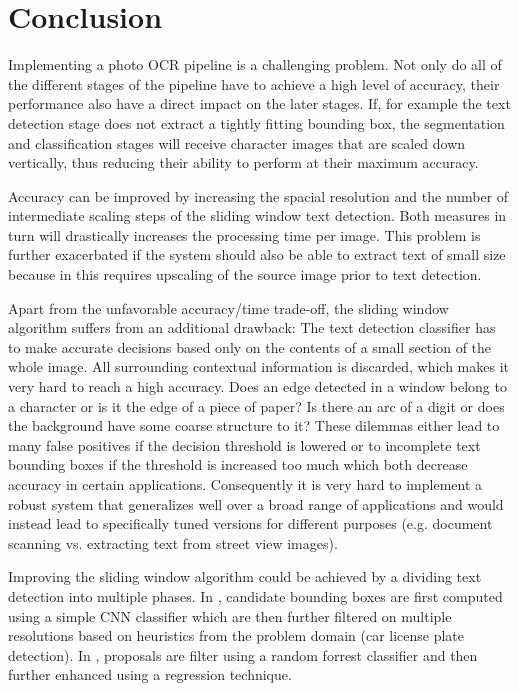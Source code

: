 \documentclass[12pt]{article}
\begin{document}
\section{Conclusion}
Implementing a photo OCR pipeline is a challenging problem. Not only do all of the different stages
of the pipeline have to achieve a high level of accuracy, their performance also have a direct
impact on the later stages. If, for example the text detection stage does not extract a tightly
fitting bounding box, the segmentation and classification stages will receive character images
that are scaled down vertically, thus reducing their ability to perform at their maximum
accuracy.

Accuracy can be improved by increasing the spacial resolution and the number of intermediate scaling steps
of the sliding window text detection.
Both measures in turn will drastically increases the processing time per image. This problem is
further exacerbated if the system should also be able to extract text of small size because in this requires
upscaling of the source image prior to text detection.

Apart from the unfavorable accuracy/time trade-off, the sliding window algorithm suffers from an additional
drawback: The text detection classifier has to make accurate decisions based only on the contents
of a small section of the whole image. All surrounding contextual information is discarded, which
makes it very hard to reach a high accuracy. Does an edge detected in a window belong to a character
or is it the edge of a piece of paper? Is there an arc of a digit or does the background have
some coarse structure to it? These dilemmas either lead to many false positives if the
decision threshold is lowered or to incomplete text bounding boxes if the threshold is increased
too much which both decrease accuracy in certain applications. Consequently it is very hard
to implement a robust system that generalizes well over a broad range of applications and
would instead lead to specifically tuned versions for different purposes
(e.g. document scanning vs. extracting text from street view images).

Improving the sliding window algorithm could be achieved by a dividing text detection into
multiple phases. In \cite{Li2016}, candidate bounding boxes are first computed using a
simple CNN classifier which are then further filtered on multiple resolutions
based on heuristics from the problem domain (car license plate detection). In \cite{Jaderberg2016},
proposals are filter using a random forrest classifier and then further enhanced using a regression
technique.
\end{document}
